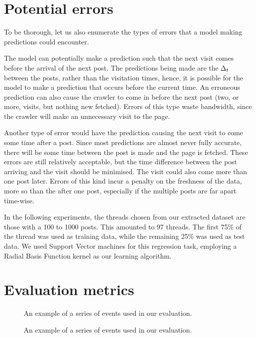 
\section{Potential errors}
To be thorough, let us also enumerate the types of errors that a model making 
predictions could encounter.

The model can potentially make a prediction such that the next visit comes 
before the arrival of the next post. The predictions being made are the $\Delta_t$ 
between the posts, rather than the visitation times, hence, it is possible for 
the model to make a prediction that occurs before the current time. An erroneous 
prediction can also cause the crawler to come in before the next post (two, or 
more, visits, but nothing new fetched). Errors of this type waste bandwidth, 
since the crawler will make an unnecessary visit to the page.

Another type of error would have the prediction causing the next visit to come 
some time after a post. Since most predictions are almost never fully accurate, 
there will be some time between the post is made and the page is fetched. These 
errors are still relatively acceptable, but the time difference between the post 
arriving and the visit should be minimised. The visit could also come more than 
one post later. Errors of this kind incur a penalty on the freshness of the 
data, more so than the after one post, especially if the multiple posts are far 
apart time-wise.

In the following experiments, the threads chosen from our extracted dataset are 
those with a 100 to 1000 posts. This amounted to 97 threads. The first 75\% of 
the thread was used as training data, while the remaining 25\% was used as test 
data. We used Support Vector machines for this regression task, employing a 
Radial Basis Function kernel as our learning algorithm. 


\section{Evaluation metrics}

\begin{figure}
	\begin{center}
	
	\caption{An example of a series of events used in our evaluation.}
	\end{center}
\end{figure}
\begin{figure}
	\begin{center}
	
	\caption{An example of a series of events used in our evaluation.}
	\end{center}
\end{figure}

